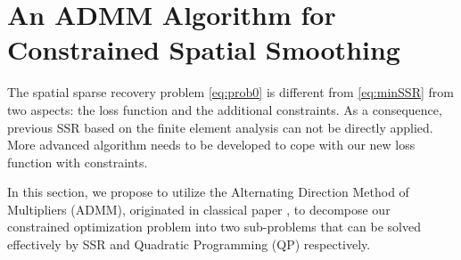 \section{An ADMM Algorithm for\\ Constrained Spatial Smoothing}
\label{sec:model}

The spatial sparse recovery problem \eqref{eq:prob0} is different from \eqref{eq:minSSR} from two aspects: the loss function and the additional constraints.  As a consequence, previous SSR based on the finite element analysis can not be directly applied. More advanced algorithm needs to be developed to cope with our new loss function with constraints. 

In this section, we propose to utilize the Alternating Direction Method of Multipliers (ADMM), originated in classical paper \cite{douglas1956numerical}, to decompose our constrained optimization problem into two sub-problems that can be solved effectively by SSR and Quadratic Programming (QP) respectively. 








